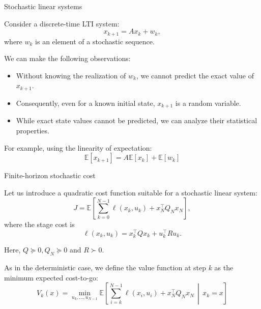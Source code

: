 \documentclass{beamer}
\begin{document}
\begin{frame}{Stochastic linear systems}
	\begin{flushleft}
		
Consider a discrete-time LTI system:
\[
x_{k+1}=Ax_k+w_k,
\]
where $w_k$ is an element of a stochastic sequence.

We can make the following observations:

\begin{itemize}
	\item Without knowing the realization of $w_k$, we cannot predict
	the exact value of $x_{k+1}$.
	
	\item Consequently, even for a known initial state, $x_{k+1}$
	is a random variable.
	
	\item While exact state values cannot be predicted, we can
	analyze their statistical properties.
\end{itemize}

\vspace{0.2cm}

For example, using the linearity of expectation:
\[
\boxed{
	\mathbb{E}[x_{k+1}]
	= A\mathbb{E}[x_k]+\mathbb{E}[w_k]
}
\]
		
	\end{flushleft}
\end{frame}

\begin{frame}{Finite-horizon stochastic cost}
	\begin{flushleft}
		
Let us introduce a quadratic cost function suitable for a
stochastic linear system:
\[
J = \mathbb{E}\left[
\sum_{k=0}^{N-1} \ell(x_k,u_k)
+ x_N^\top Q_N x_N
\right],
\]
where the stage cost is
\[
\ell(x_k,u_k)
= x_k^\top Q x_k + u_k^\top R u_k.
\]

Here, $Q\succeq 0, Q_N\succeq 0$ and $R\succ 0$.

\vspace{0.3cm}

As in the deterministic case, we define the value function
at step $k$ as the minimum expected cost-to-go:
\[
\boxed{
	V_k(x) =
	\min_{u_k,\ldots,u_{N-1}}
	\mathbb{E}\left[
	\sum_{i=k}^{N-1}\ell(x_i,u_i)
	+x_N^\top Q_N x_N
	\,\middle|\, x_k=x
	\right]
}
\]
		
	\end{flushleft}
\end{frame}
\end{document}

